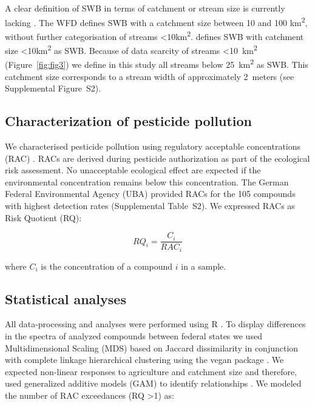 \documentclass[journal=esthag,manuscript=article]{achemso}
\begin{document}
A clear definition of SWB in terms of catchment or stream size is currently lacking \citep{lorenz_specifics_2016}. 
The WFD defines SWB with a catchment size between 10 and 100 km\textsuperscript{2}, without further categorisation of streams \textless 10km\textsuperscript{2}. 
\citet{lorenz_specifics_2016} defines SWB with catchment size \textless 10km\textsuperscript{2} as SWB.
Because of data scarcity of streams \textless 10~km\textsuperscript{2} (Figure~\ref{fig:fig3}) we define in this study all streams below 25~km\textsuperscript{2} as SWB. This catchment size corresponds to a stream width of approximately 2~meters (see Supplemental Figure~S2).


\subsection{Characterization of pesticide pollution}
We characterised pesticide pollution using regulatory acceptable concentrations (RAC) \citep{brock_linking_2010}.
RACs are derived during pesticide authorization as part of the ecological risk assessment.
No unacceptable ecological effect are expected if the environmental concentration remains below this concentration.
The German Federal Environmental Agency (UBA) provided RACs for the 105 compounds with highest detection rates (Supplemental Table~S2). 
We expressed RACs as Risk Quotient (RQ):

\begin{equation}
RQ_i = \frac{C_i}{RAC_i}
\end{equation}

where $C_i$ is the concentration of a compound $i$ in a sample.


\subsection{Statistical analyses}
All data-processing and analyses were performed using R \citep{r_core_team_r:_2016}.
To display differences in the spectra of analyzed compounds between federal states we used Multidimensional Scaling (MDS) based on Jaccard dissimilarity in conjunction with complete linkage hierarchical clustering using the vegan package \citep{oksanen_vegan:_2016}.
We expected non-linear responses to agriculture and catchment size and therefore, used generalized additive models (GAM) to identify relationships \citep{fewster_analysis_2000}.
We modeled the number of RAC exceedances (RQ \textgreater 1) as:
\end{document}
